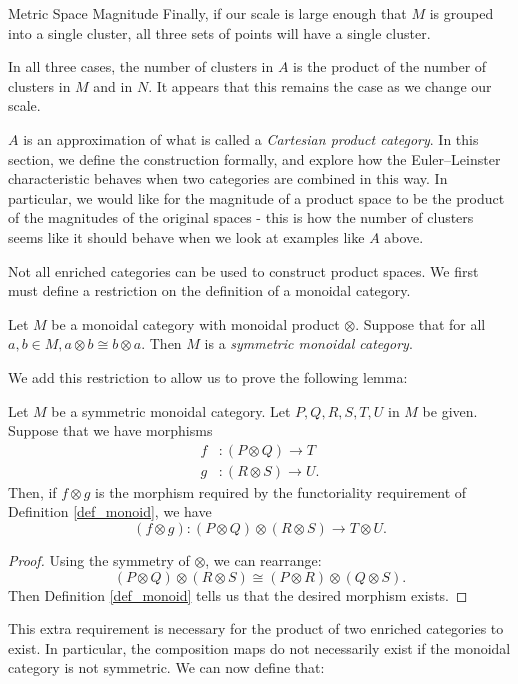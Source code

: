 \documentclass[12pt]{pom_thesis}
\begin{document}
\begin{chapter}{Metric Space Magnitude}
Finally, if our scale is large enough that $M$ is grouped into a single cluster, all three sets of points will have a single cluster.

In all three cases, the number of clusters in $A$ is the product of the number of clusters in $M$ and in $N$. It appears that this remains the case as we change our scale. 

$A$ is an approximation of what is called a \emph{Cartesian product category}. In this section, we define the construction formally, and explore how the Euler--Leinster characteristic behaves when two categories are combined in this way. In particular, we would like for the magnitude of a product space to be the product of the magnitudes of the original spaces - this is how the number of clusters seems like it should behave when we look at examples like $A$ above.

Not all enriched categories can be used to construct product spaces. We first must define a restriction on the definition of a monoidal category.

\begin{defn}
Let $M$ be a monoidal category with monoidal product $\otimes$. Suppose that for all $a,b \in M, a \otimes b \cong b \otimes a$. Then $M$ is a \emph{symmetric monoidal category}.
\end{defn}

We add this restriction to allow us to prove the following lemma:

\begin{lemma}
Let $M$ be a symmetric monoidal category. Let $P,Q,R,S,T,U$ in $M$ be given. Suppose that we have morphisms
\begin{align*}
f&:(P \otimes Q) \rightarrow T\\
g&:(R \otimes S) \rightarrow U.
\end{align*}
Then, if $f \otimes g$ is the morphism required by the functoriality requirement of Definition \ref{def_monoid}, we have
\[
(f \otimes g):(P \otimes Q) \otimes (R \otimes S) \rightarrow T \otimes U.
\]
\end{lemma}
\begin{proof}\label{prod_morph}
Using the symmetry of $\otimes$, we can rearrange:
\[
(P \otimes Q) \otimes (R \otimes S) \cong (P \otimes R) \otimes (Q \otimes S).
\]
Then Definition \ref{def_monoid} tells us that the desired morphism exists.
\end{proof}
This extra requirement is necessary for the product of two enriched categories to exist. In particular, the composition maps do not necessarily exist if the monoidal category is not symmetric. We can now define that:


\end{chapter}
\end{document}
